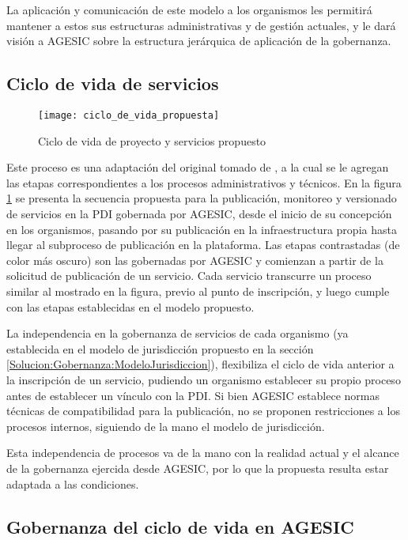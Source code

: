     La aplicación y comunicación de este modelo a los organismos les permitirá mantener a estos sus estructuras administrativas y de gestión actuales, y le dará visión a AGESIC sobre la estructura jerárquica de aplicación de la gobernanza.

  \subsection{Ciclo de vida de servicios}
    \label{Solucion:Gobernanza:CicloDeVida}

    \begin{figure}[h]
      \centering
      \texttt{[image: ciclo\_de\_vida\_propuesta]}
      \caption{Ciclo de vida de proyecto y servicios propuesto}
      \label{Figura:CicloDeVidaPropuesta}
    \end{figure}

    Este proceso es una adaptación del original tomado de \cite{Erl:2011:SGG:1983453}, a la cual se le agregan las etapas correspondientes a los procesos administrativos y técnicos. En la figura \ref{Figura:CicloDeVidaPropuesta} se presenta la secuencia propuesta para la publicación, monitoreo y versionado de servicios en la PDI gobernada por AGESIC, desde el inicio de su concepción en los organismos, pasando por su publicación en la infraestructura propia hasta llegar al subproceso de publicación en la plataforma. Las etapas contrastadas (de color más oscuro) son las gobernadas por AGESIC y comienzan a partir de la solicitud de publicación de un servicio. Cada servicio transcurre un proceso similar al mostrado en la figura, previo al punto de inscripción, y luego cumple con las etapas establecidas en el modelo propuesto.

    La independencia en la gobernanza de servicios de cada organismo (ya establecida en el modelo de jurisdicción propuesto en la sección \ref{Solucion:Gobernanza:ModeloJurisdiccion}), flexibiliza el ciclo de vida anterior a la inscripción de un servicio, pudiendo un organismo establecer su propio proceso antes de establecer un vínculo con la PDI. Si bien AGESIC establece normas técnicas de compatibilidad para la publicación, no se proponen restricciones a los procesos internos, siguiendo de la mano el modelo de jurisdicción.

    Esta independencia de procesos va de la mano con la realidad actual y el alcance de la gobernanza ejercida desde AGESIC, por lo que la propuesta resulta estar adaptada a las condiciones.

  \subsection{Gobernanza del ciclo de vida en AGESIC}
    \label{Solucion:Gobernanza:CicloDeVidaAGESIC}

